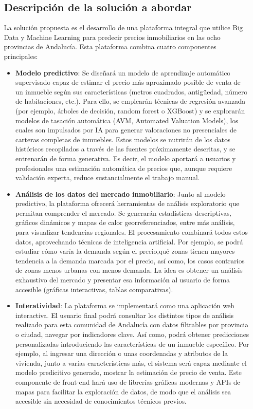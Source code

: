 \documentclass[a4paper,11pt]{book}
\begin{document}
\subsection{Descripción de la solución a abordar}
La solución propuesta es el desarrollo de una plataforma integral que utilice Big Data y Machine Learning para predecir precios inmobiliarios en las ocho provincias de Andalucía. Esta plataforma combina cuatro componentes principales:
\begin{itemize}
    \item \textbf{Modelo predictivo}: 
    Se diseñará un modelo de aprendizaje automático supervisado capaz de estimar el precio más aproximado posible de venta de un inmueble según sus características (metros cuadrados, antigüedad, número de habitaciones, etc.). Para ello, se emplearán técnicas de regresión avanzada (por ejemplo, árboles de decisión, random forest o XGBoost) y se explorarán modelos de tasación automática (AVM, Automated Valuation Models), los cuales son impulsados por IA para generar valoraciones no presenciales de carteras completas de inmuebles.
    Estos modelos se nutrirán de los datos históricos recopilados a través de las fuentes próximamente descritas, y se entrenarán de forma generativa. Es decir, el modelo aportará a usuarios y profesionales una estimación automática de precios que, aunque requiere validación experta, reduce sustancialmente el trabajo manual.
    
    \item \textbf{Análisis de los datos del mercado inmobiliario}: Junto al modelo predictivo, la plataforma ofrecerá herramientas de análisis exploratorio que permitan comprender el mercado. Se generarán estadísticas descriptivas, gráficos dinámicos y mapas de calor georreferenciados, entre más análisis, para visualizar tendencias regionales. El procesamiento combinará todos estos datos, aprovechando técnicas de inteligencia artificial. Por ejemplo, se podrá estudiar cómo varía la demanda según el precio,qué zonas tienen mayores tendencia a la demanda marcada por el precio, así como, los casos contrarios de zonas menos urbanas con menos demanda. La idea es obtener un análisis exhaustivo del mercado y presentar esa información al usuario de forma accesible (gráficas interactivas, tablas comparativas).

    \item \textbf{Interatividad}: La plataforma se implementará como una aplicación web interactiva. El usuario final podrá consultar los distintos tipos de análisis realizado para esta comunidad de Andalucía con datos filtrables por provincia o ciudad, navegar por indicadores clave. Así como, podrá obtener predicciones personalizadas introduciendo las características de un inmueble específico. Por ejemplo, al ingresar una dirección o unas coordenadas y atributos de la vivienda, junto a varias características más, el sistema será capaz mediante el modelo predicitivo generado, mostrar la estimación de precio de venta. Este componente de front-end hará uso de librerías gráficas modernas y APIs de mapas para facilitar la exploración de datos, de modo que el análisis sea accesible sin necesidad de conocimientos técnicos previos.


\end{itemize}
\end{document}
